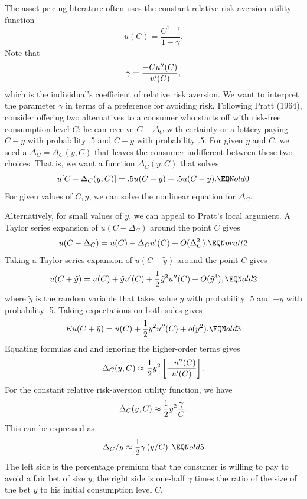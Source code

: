 The asset-pricing literature
often uses the constant relative risk-aversion utility function
$$ u(C) = {\frac{C^{1-\gamma}}{1-\gamma}}.$$
Note that
$$ \gamma = {- C u''(C) \over u'(C) },$$
which is the individual's coefficient of relative risk aversion.
  We want to interpret the parameter $\gamma$ in terms of a preference
for avoiding risk.   Following Pratt (1964), consider
 offering  two alternatives to a
 consumer who starts off with risk-free consumption
level $C$: he can receive $C - \Delta_C$ with certainty
or  a lottery paying $C - y$ with probability .5 and $C+y$ with probability
.5.   For given   $y$  and $C$, we seed a  $\Delta_C = \Delta_C(y,C)$ that leaves the consumer
indifferent between these two choices.  That is, we want
a function $\Delta_C(y,C)$ that solves
$$ u[C - \Delta_C(y,C)] = .5 u(C+y) + .5 u(C-y). \EQN old0 $$
  For given  values of $C,y$, we can solve the nonlinear
equation  for $\Delta_C$.

Alternatively, for small values of $y$, we can appeal to
Pratt's local  argument.    A Taylor series
expansion of $u(C - \Delta_C)$ around the point $C$ gives
$$ u(C -\Delta_C) = u(C) - \Delta_C u'(C) + O(\Delta_C^2) . \EQN pratt2$$
 Taking a Taylor series expansion
of $u(C+\tilde y) $ around the point $C$ gives
$$ u(C+\tilde y)   = u(C) + \tilde y u'(C) +  {1 \over 2}
         \tilde y^2 u''(C) + O(\tilde y^3) , \EQN old2$$
where $\tilde y$ is the random variable that takes
value $y$ with probability .5 and $-y$ with probability .5.
Taking expectations  on both sides gives
$$ Eu(C+\tilde y) = u(C) + { 1\over 2} y^2 u''(C) + o(y^2). \EQN old3 $$
Equating formulas
  and  and ignoring the  higher-order terms gives
$$ \Delta_C(y,C) \approx {1 \over 2} y^2 \left[{ - u''(C) \over u'(C)}\right] .$$
For the constant relative risk-aversion
utility function, we have
$$ \Delta_C(y,C) \approx {1 \over 2} y^2 {\gamma \over C}.  $$
This can be expressed
as
$$ \Delta_C / y \approx {1 \over 2} \gamma \left(y / C \right) . \EQN old5 $$
The left side is the percentage premium that the consumer is willing
to pay to avoid a fair bet     of size $y$; the right
side is one-half $\gamma$ times the ratio of the size of the
bet $y$ to his initial consumption level $C$.







